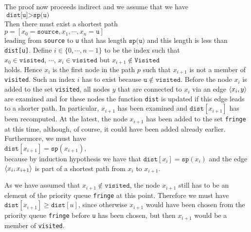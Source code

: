 \begin{enumerate}
      The proof now proceeds indirect and we assume that we have
      \\[0.2cm]
      \hspace*{1.3cm} $\texttt{dist[u]} > \texttt{sp(u)}$
      \\[0.2cm]
      Then there must exist a shortest path 
      \\[0.2cm]
      \hspace*{1.3cm} $p = [ x_0 = \texttt{source}, x_1, \cdots, x_n = \texttt{u} ]$
      \\[0.2cm]
      leading from \texttt{source} to \texttt{u} that has length $\texttt{sp(u)}$ and this length is less
      than \texttt{dist[u]}.  Define  $i\in\{0,\cdots,n-1\}$ to be the index such that
      \\[0.2cm]
      \hspace*{1.3cm}
      $x_0\in \texttt{visited}$, $\cdots$, $x_i\in \texttt{visited}$ \quad but \quad $x_{i+1} \not\in \mathtt{Visited}$
      \\[0.2cm]
      holds.  Hence $x_i$ is the first node in the path  $p$ such that $x_{i+1}$ is not a member of
      \texttt{visited}.  Such an index $i$ has to exist because $\texttt{u} \not\in \mathtt{visited}$.
      Before the node $x_i$ is added to the set \texttt{visited}, all nodes $y$ that are connected
      to $x_i$ via an edge $\pair(x_i, y)$ are examined and for these nodes the function
      \texttt{dist} is updated if this edge leads to a shorter path.  In particular, $x_{i+1}$ has
      been examined and $\texttt{dist}[x_{i+1}]$ has been recomputed.  At the latest, the node
      $x_{i+1}$ has been added to the set  \texttt{fringe} at this time, although, of course, it
      could have been added already earlier.  Furthermore, we must have
      \\[0.2cm]
      \hspace*{1.3cm}
      $\texttt{dist}[x_{i+1}] = \texttt{sp}(x_{i+1})$,
      \\[0.2cm]
      because by induction hypothesis we have that $\texttt{dist}[x_i] = \texttt{sp}(x_i)$ and 
      the edge $\pair(x_i,x_{i+1})$ is part of a shortest path from  $x_i$ to $x_{i+1}$.
      
      As we have assumed that $x_{i+1} \not\in \texttt{visited}$, the node $x_{i+1}$ still has to be an
      element of the priority queue \texttt{fringe} at this point.  Therefore we must have
      $\texttt{dist}[x_{i+1}] \geq \texttt{dist}[u]$, since otherwise  $x_{i+1}$ would have been
      chosen from the priority queue \texttt{fringe} before \texttt{u} has been chosen, but then $x_{i+1}$
      would be a member of \texttt{visited}.


\end{enumerate}

